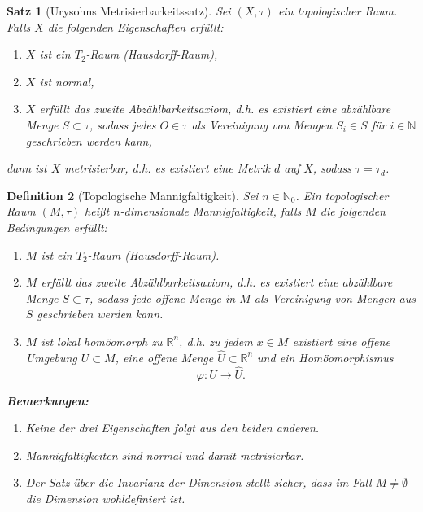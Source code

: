 \documentclass[a4paper,12pt]{article}
\theoremstyle{break}
\newtheorem{definition}{Definition}[section]
\newtheorem{theorem}[definition]{Satz}
\begin{document}
\begin{theorem}[Urysohns Metrisierbarkeitssatz]
Sei $(X, \tau)$ ein topologischer Raum. Falls $X$ die folgenden Eigenschaften erfüllt:
\begin{enumerate}
    \item $X$ ist ein $T_2$-Raum (Hausdorff-Raum),
    \item $X$ ist normal,
    \item $X$ erfüllt das \emph{zweite Abzählbarkeitsaxiom}, d.h. es existiert eine abzählbare Menge $S \subset \tau$, sodass jedes $O \in \tau$ als Vereinigung von Mengen $S_i \in S$ für $i \in \mathbb{N}$ geschrieben werden kann,
\end{enumerate}
dann ist $X$ metrisierbar, d.h. es existiert eine Metrik $d$ auf $X$, sodass $\tau = \tau_d$.
\end{theorem}

\begin{definition}[Topologische Mannigfaltigkeit]
Sei $n \in \mathbb{N}_0$. Ein topologischer Raum $(M, \tau)$ heißt \emph{$n$-dimensionale Mannigfaltigkeit}, falls $M$ die folgenden Bedingungen erfüllt:
\begin{enumerate}
    \item $M$ ist ein $T_2$-Raum (Hausdorff-Raum).
    \item $M$ erfüllt das \emph{zweite Abzählbarkeitsaxiom}, d.h. es existiert eine abzählbare Menge $S \subset \tau$, sodass jede offene Menge in $M$ als Vereinigung von Mengen aus $S$ geschrieben werden kann.
    \item $M$ ist lokal homöomorph zu $\mathbb{R}^n$, d.h. zu jedem $x \in M$ existiert eine offene Umgebung $U \subset M$, eine offene Menge $\hat{U} \subset \mathbb{R}^n$ und ein Homöomorphismus 
    \[
    \varphi: U \to \hat{U}.
    \]
\end{enumerate}
\textbf{Bemerkungen:}
\begin{enumerate}
    \item Keine der drei Eigenschaften folgt aus den beiden anderen.
    \item Mannigfaltigkeiten sind normal und damit metrisierbar.
    \item Der Satz über die Invarianz der Dimension stellt sicher, dass im Fall $M \neq \emptyset$ die Dimension wohldefiniert ist.
\end{enumerate}
\end{definition}
\end{document}
